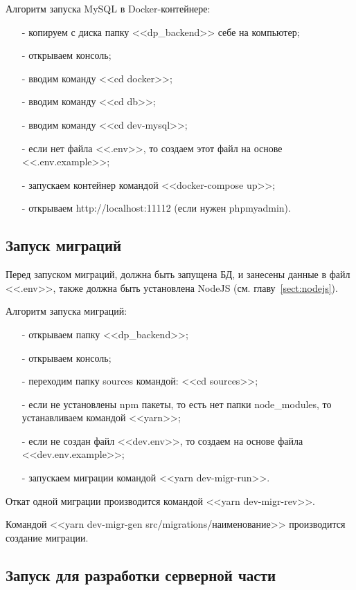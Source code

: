 Алгоритм запуска MySQL в Docker-контейнере:
\begin{enumerate}
    \item[-] копируем с диска папку <<dp\_backend>> себе на компьютер;
    \item[-] открываем консоль;
    \item[-] вводим команду <<cd docker>>;
    \item[-] вводим команду <<cd db>>;
    \item[-] вводим команду <<cd dev-mysql>>;
    \item[-] если нет файла <<.env>>, то создаем этот файл на основе <<.env.example>>;
    \item[-] запускаем контейнер командой <<docker-compose up>>;
    \item[-] открываем http://localhost:11112 (если нужен phpmyadmin).
\end{enumerate}

\subsection{Запуск миграций}

Перед запуском миграций, должна быть запущена БД, и занесены данные в файл <<.env>>,
также должна быть установлена NodeJS (см. главу~\ref{sect:nodejs}).

Алгоритм запуска миграций:
\begin{enumerate}
    \item[-] открываем папку <<dp\_backend>>;
    \item[-] открываем консоль;
    \item[-] переходим папку sources командой: <<cd sources>>;
    \item[-] если не установлены npm пакеты, то есть нет папки node\_modules, то устанавливаем командой <<yarn>>;
    \item[-] если не создан файл <<dev.env>>, то создаем на основе файла\\ <<dev.env.example>>;
    \item[-] запускаем миграции командой <<yarn dev-migr-run>>.
\end{enumerate}

Откат одной миграции производится командой <<yarn dev-migr-rev>>.

Командой <<yarn dev-migr-gen src/migrations/наименование>> производится создание миграции.

\subsection{Запуск для разработки серверной части}

